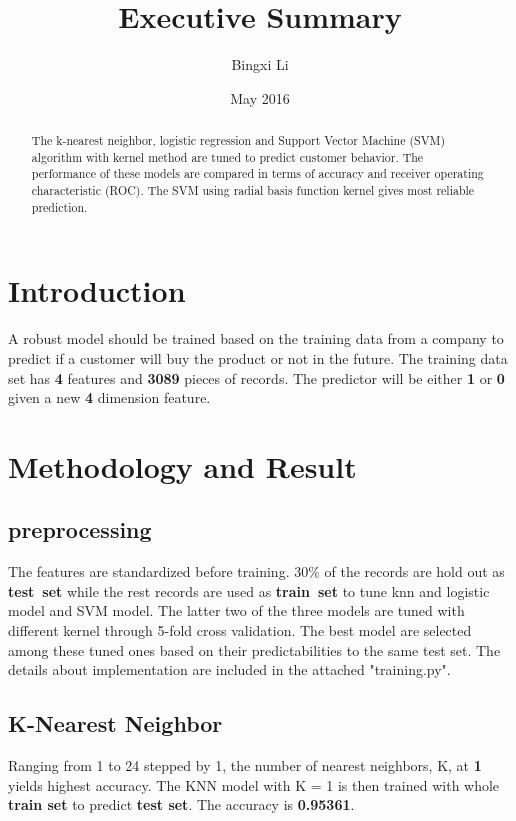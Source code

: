 \documentclass{article}
\title{\Large{Executive Summary}\vspace{-0.5cm}}
\author{Bingxi Li}
\date{\vspace{-2ex}May 2016}
\begin{document}
\begin{singlespacing}

\maketitle
\begin{abstract}
The k-nearest neighbor, logistic regression and Support Vector Machine (SVM) algorithm with kernel method are tuned to predict customer behavior. The performance of these models are compared in terms of accuracy and receiver operating characteristic (ROC). The SVM using radial basis function kernel gives most reliable prediction. 
\end{abstract}

\section{Introduction}
A robust model should be trained based on the training data from a company to predict if a customer will buy the product or not in the future. The training data set has \textbf{4} features and \textbf{3089} pieces of records. The predictor will be either \textbf{1} or \textbf{0} given a new \textbf{4} dimension feature.

\section{Methodology and Result}
\subsection{preprocessing}
The features are standardized before training. 30\% of the records are hold out as \textbf{test\ set} while the rest records are used as \textbf{train\ set} to tune knn and logistic model and SVM model. The latter two of the three models are tuned with different kernel through 5-fold cross validation. The best model are selected among these tuned ones based on their predictabilities to the same test set. The details about implementation are included in the attached "training.py".

\subsection{K-Nearest Neighbor}
Ranging from 1 to 24 stepped by 1, the number of nearest neighbors, K, at \textbf{1} yields highest accuracy. The KNN model with K = 1 is then trained with whole \textbf{train set} to predict \textbf{test set}. The accuracy is \textbf{0.95361}.


\end{singlespacing}
\end{document}
